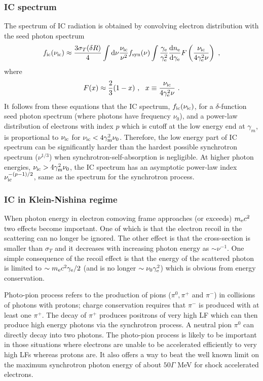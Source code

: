 \documentclass[12pt,a4paper]{article}
\newcommand{\dif}{\mathrm{d}}
\begin{document}
\subsubsection{IC spectrum}
The spectrum of IC radiation is obtained by convolving electron distribution with the seed photon spectrum 
\begin{equation}
f_{\rm ic} (\nu_{\rm ic}) \approx \dfrac{3 \sigma_T(\delta R)}{4} \int \dif \nu \dfrac{\nu_{\rm ic}}{\nu^2} f_{\rm syn}(\nu) \int \dfrac{\gamma_{\rm e}}{\gamma_{\rm e}^2} \dfrac{\dif n_{\rm e}}{\dif \gamma_{\rm e}} F\left(\dfrac{\nu_{\rm ic}}{4 \gamma_{\rm e}^2 \nu} \right) ~,
\end{equation}
where
\begin{equation}
F(x) \approx \dfrac{2}{3} (1-x) ~, ~~ x \equiv \dfrac{\nu_{\rm ic}}{4 \gamma_{\rm e}^2 \nu} ~.
\end{equation}
It follows from these equations that the IC spectrum, $f_{\rm ic} (\nu_{\rm ic})$, for a $\delta$-function seed photon spectrum (where photons have frequency $\nu_0$), and a power-law distribution of electrons with index $p$ which is cutoff at the low energy end at $\gamma_m$, is proportional to $\nu_{\rm ic}$ for $\nu_{\rm ic} < 4 \gamma_{\rm m}^2 \nu_0$. Therefore, the low energy part of IC spectrum can be significantly harder than the hardest possible synchrotron spectrum ($\nu^{1/3}$) when synchrotron-self-absorption is negligible. At higher photon energies, $\nu_{\rm ic} > 4 \gamma_{\rm m}^2 \nu_0$, the IC spectrum has an asymptotic power-law index $\nu^{-(p-1)/2}_{\rm ic}$, same as the spectrum for the synchrotron process.

\subsubsection{IC in Klein-Nishina regime}
When photon energy in electron comoving frame approaches (or exceeds) $m_{\rm e}c^2$ two effects become important. One of which is that the electron recoil in the scattering can no longer be ignored. The other effect is that the cross-section is smaller than $\sigma_T$ and it decreases with increasing photon energy as $\sim \nu^{-1}$. One simple consequence of the recoil effect is that the energy of the scattered photon is limited to $\sim m_{\rm e} c^2 \gamma_{\rm e}/2$ (and is no longer $\sim \nu_0 \gamma_{\rm e}^2$) which is obvious from energy conservation.

Photo-pion process refers to the production of pions ($\pi^0, \pi^+$ and $\pi^-$) in collisions of photons with protons; charge conservation requires that $\pi^-$ is produced with at least one $\pi^+$. The decay of $\pi^+$ produces positrons of very high LF which can then produce high energy photons via the synchrotron process. A neutral pion $\pi^0$ can directly decay into two photons. The photo-pion process is likely to be important in those situations where electrons are unable to be accelerated efficiently to very high LFs whereas protons are. It also offers a way to beat the well known limit on the maximum synchrotron photon energy of about $50 \Gamma$ MeV for shock accelerated electrons.
\end{document}
